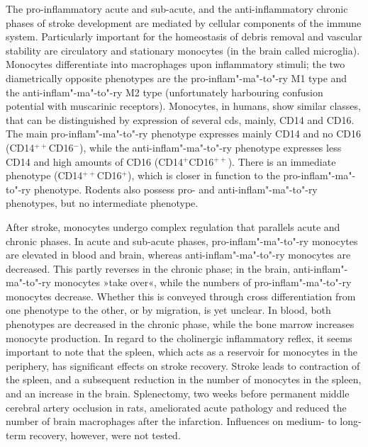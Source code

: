 The pro-inflammatory acute and sub-acute, and the anti-inflammatory chronic phases of stroke development are mediated by cellular components of the immune system. Particularly important for the homeostasis of debris removal and vascular stability are circulatory and stationary monocytes (in the brain called microglia).\cite{ElAli2016} Monocytes differentiate into macrophages upon inflammatory stimuli; the two diametrically opposite phenotypes are the pro-inflam"-ma"-to"-ry M1 type and the anti-inflam"-ma"-to"-ry M2 type (unfortunately harbouring confusion potential with muscarinic receptors). Monocytes, in humans, show similar classes, that can be distinguished by expression of several \acp{cd}, mainly, CD14 and CD16. The main pro-inflam"-ma"-to"-ry phenotype expresses mainly CD14 and no CD16 (CD14$^{++}$CD16$^{-}$), while the anti-inflam"-ma"-to"-ry phenotype expresses less CD14 and high amounts of CD16 (CD14$^{+}$CD16$^{++}$). There is an immediate phenotype (CD14$^{++}$CD16$^{+}$), which is closer in function to the pro-inflam"-ma"-to"-ry phenotype. Rodents also possess pro- and anti-inflam"-ma"-to"-ry phenotypes, but no intermediate phenotype.\cite{ElAli2016}

After stroke, monocytes undergo complex regulation that parallels acute and chronic phases. In acute and sub-acute phases, pro-inflam"-ma"-to"-ry monocytes are elevated in blood and brain, whereas anti-inflam"-ma"-to"-ry monocytes are decreased. This partly reverses in the chronic phase; in the brain, anti-inflam"-ma"-to"-ry monocytes »take over«, while the numbers of pro-inflam"-ma"-to"-ry monocytes decrease. Whether this is conveyed through cross differentiation from one phenotype to the other, or by migration, is yet unclear.\cite{ElAli2016} In blood, both phenotypes are decreased in the chronic phase, while the bone marrow increases monocyte production. In regard to the cholinergic inflammatory reflex, it seems important to note that the spleen, which acts as a reservoir for monocytes in the periphery,\cite{Swirski2009} has significant effects on stroke recovery. Stroke leads to contraction of the spleen, and a subsequent reduction in the number of monocytes in the spleen, and an increase in the brain.\cite{Kim2014} Splenectomy, two weeks before permanent middle cerebral artery occlusion in rats, ameliorated acute pathology and reduced the number of brain macrophages after the infarction.\cite{Ajmo2008} Influences on medium- to long-term recovery, however, were not tested.

